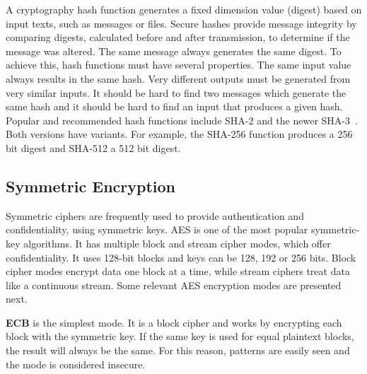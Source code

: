 A cryptography hash function generates a fixed dimension value (digest) based on input texts, such as messages or files. Secure hashes provide message integrity by comparing digests, calculated before and after transmission, to determine if the message was altered. The same message always generates the same digest.
To achieve this, hash functions must have several properties. The same input value always results in the same hash. Very different outputs must be generated from very similar inputs. It should be hard to find two messages which generate the same hash and it should be hard to find an input that produces a given hash.
Popular and recommended hash functions include \ac{SHA}-2 and the newer \ac{SHA}-3~\cite{dang2015secure}. Both versions have variants. For example, the \ac{SHA}-256 function produces a 256 bit digest and \ac{SHA}-512 a 512 bit digest.

\subsection{Symmetric Encryption}\label{chap:background:crypto:symmetric}

Symmetric ciphers are frequently used to provide authentication and confidentiality, using symmetric keys.
\ac{AES} is one of the most popular symmetric-key algorithms. It has multiple block and stream cipher modes, which offer confidentiality. It uses 128-bit blocks and keys can be 128, 192 or 256 bits. Block cipher modes encrypt data one block at a time, while stream ciphers treat data like a continuous stream. Some relevant AES encryption modes are presented next.

\textbf{\ac{ECB}} is the simplest mode. It is a block cipher and works by encrypting each block with the symmetric key. If the same key is used for equal plaintext blocks, the result will always be the same. For this reason, patterns are easily seen and the mode is considered insecure.

